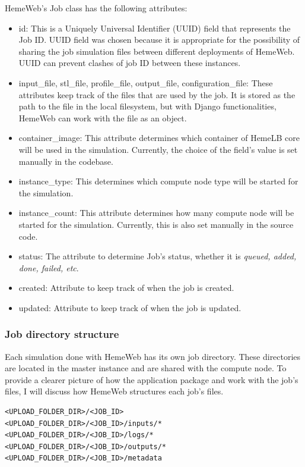 HemeWeb's Job class has the following attributes:
\begin{itemize}
    \item id:  This is a Uniquely Universal Identifier (UUID) field that represents the Job ID. UUID field was chosen because it is appropriate for the possibility of sharing the job simulation files between different deployments of HemeWeb. UUID can prevent clashes of job ID between these instances.
    \item input\_file, stl\_file, profile\_file, output\_file, configuration\_file:  These attributes keep track of the files that are used by the job. It is stored as the path to the file in the local filesystem, but with Django functionalities, HemeWeb can work with the file as an object.
    \item container\_image:  This attribute determines which container of HemeLB core will be used in the simulation. Currently, the choice of the field's value is set manually in the codebase. 
    \item instance\_type: This determines which compute node type will be started for the simulation. 
    \item instance\_count: This attribute determines how many compute node will be started for the simulation. Currently, this is also set manually in the source code. 
    \item status: The attribute to determine Job's status, whether it is \textit{queued, added, done, failed, etc}.
    \item created: Attribute to keep track of when the job is created.
    \item updated: Attribute to keep track of when the job is updated.
\end{itemize}



\subsubsection{Job directory structure}

Each simulation done with HemeWeb has its own job directory. These directories are located in the master instance and are shared with the compute node. To provide a clearer picture of how the application package and work with the job's files, I will discuss how HemeWeb structures each job's files.


\begin{lstlisting}[numbers=none]
<UPLOAD_FOLDER_DIR>/<JOB_ID>
<UPLOAD_FOLDER_DIR>/<JOB_ID>/inputs/*
<UPLOAD_FOLDER_DIR>/<JOB_ID>/logs/*
<UPLOAD_FOLDER_DIR>/<JOB_ID>/outputs/*
<UPLOAD_FOLDER_DIR>/<JOB_ID>/metadata
\end{lstlisting}


